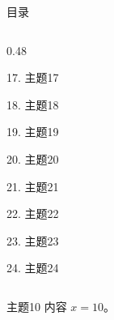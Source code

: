 \documentclass[aspectratio=169,10pt,fontset=fandol]{ctexbeamer}
\begin{document}
\begin{frame}[t,fragile]{目录}
\begin{columns}[T,onlytextwidth]
\begin{column}{0.48\textwidth}
{\color{gray!40}\small 17. 主题17\par}\vspace{0.22em}
{\color{gray!40}\small 18. 主题18\par}\vspace{0.22em}
{\color{gray!40}\small 19. 主题19\par}\vspace{0.22em}
{\color{gray!40}\small 20. 主题20\par}\vspace{0.22em}
{\color{gray!40}\small 21. 主题21\par}\vspace{0.22em}
{\color{gray!40}\small 22. 主题22\par}\vspace{0.22em}
{\color{gray!40}\small 23. 主题23\par}\vspace{0.22em}
{\color{gray!40}\small 24. 主题24\par}\vspace{0.22em}
\end{column}
\end{columns}
\end{frame}
\begin{frame}[t,fragile]{主题10}
\normalsize
{\normalsize
内容 $x=10$。
}
\end{frame}
\end{document}
